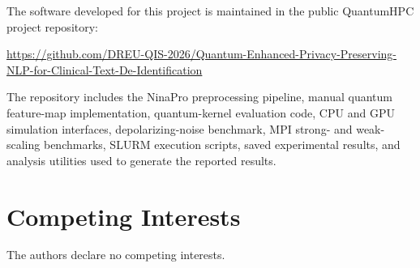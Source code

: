 \documentclass[pdflatex,sn-mathphys-num]{sn-jnl}%
\theoremstyle{thmstyleone}%
\theoremstyle{thmstyletwo}%
\theoremstyle{thmstylethree}%
\begin{document}
The software developed for this project is maintained in the public QuantumHPC
project repository:

\url{https://github.com/DREU-QIS-2026/Quantum-Enhanced-Privacy-Preserving-NLP-for-Clinical-Text-De-Identification}

The repository includes the NinaPro preprocessing pipeline, manual quantum
feature-map implementation, quantum-kernel evaluation code, CPU and GPU
simulation interfaces, depolarizing-noise benchmark, MPI strong- and weak-scaling
benchmarks, SLURM execution scripts, saved experimental results, and analysis
utilities used to generate the reported results.

\section*{Competing Interests}

The authors declare no competing interests.

\backmatter

\end{document}
